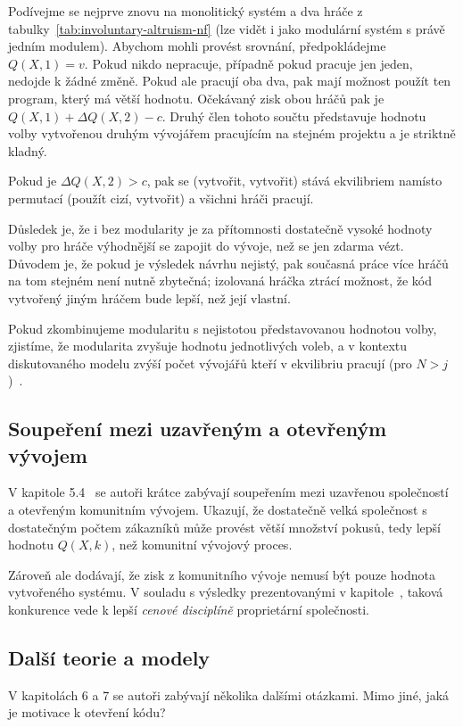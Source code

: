 \begin{multicols}{2}
		Podívejme se nejprve znovu na monolitický systém a dva hráče z tabulky~\ref{tab:involuntary-altruism-nf} (lze vidět i jako modulární systém s právě jedním modulem). Abychom mohli provést srovnání, předpokládejme $Q(X, 1) = v$. Pokud nikdo nepracuje, případně pokud pracuje jen jeden, nedojde k žádné změně. Pokud ale pracují oba dva, pak mají možnost použít ten program, který má větší hodnotu. Očekávaný zisk obou hráčů pak je $Q(X, 1) + \Delta Q(X,2) - c$. Druhý člen tohoto součtu představuje hodnotu volby vytvořenou druhým vývojářem pracujícím na stejném projektu a je striktně kladný.

		Pokud je $\Delta Q(X,2) > c$, pak se (vytvořit, vytvořit) stává ekvilibriem namísto permutací (použít cizí, vytvořit) a všichni hráči pracují.

		Důsledek je, že i bez modularity je za přítomnosti dostatečně vysoké hodnoty volby pro hráče výhodnější se zapojit do vývoje, než se jen zdarma vézt. Důvodem je, že pokud je výsledek návrhu nejistý, pak současná práce více hráčů na tom stejném není nutně zbytečná; izolovaná hráčka ztrácí možnost, že kód vytvořený jiným hráčem bude lepší, než její vlastní.

		Pokud zkombinujeme modularitu s nejistotou představovanou hodnotou volby, zjistíme, že modularita zvyšuje hodnotu jednotlivých voleb, a v kontextu diskutovaného modelu zvýší počet vývojářů kteří v ekvilibriu pracují (pro $N > j$)~\cite[kap. 5.2 a 5.3]{architecture-opensource}.

	\subsection*{Soupeření mezi uzavřeným a otevřeným vývojem}
		V kapitole 5.4~\cite{architecture-opensource} se autoři krátce zabývají soupeřením mezi uzavřenou společností a otevřeným komunitním vývojem. Ukazují, že dostatečně velká společnost s dostatečným počtem zákazníků může provést větší množství pokusů, tedy lepší hodnotu $Q(X,k)$, než komunitní vývojový proces.

		Zároveň ale dodávají, že zisk z komunitního vývoje nemusí být pouze hodnota vytvořeného systému. V souladu s výsledky prezentovanými v kapitole~, taková konkurence vede k lepší {\em cenové disciplíně} proprietární společnosti.

	\subsection*{Další teorie a modely}
		V kapitolách 6 a 7 se autoři zabývají několika dalšími otázkami. Mimo jiné, jaká je motivace k otevření kódu?


\end{multicols}
